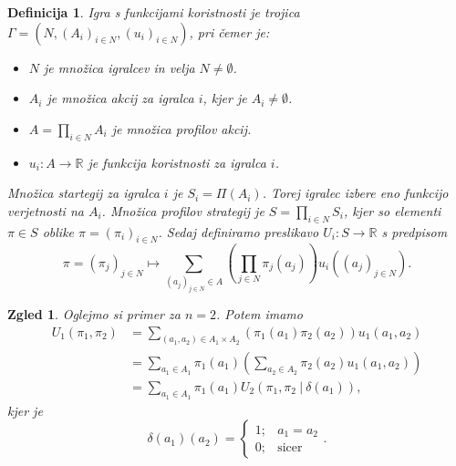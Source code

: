 \documentclass[10pt, a4paper]{article}
\newtheorem{defi}[izr]{Definicija}
\newenvironment{noticeB}{%
  \tcolorbox[%
  notitle,
  empty,
  enhanced,  %
  breakable,
  coltext=black,
  colback=white, 
  fontupper=\rmfamily,
  noparskip,
  sharp corners,
  boxrule=-1pt,  %
  frame hidden,
  left=7pt,  %
  right=7pt,
  top=5pt,
  bottom=5pt,
  before skip=2.5ex plus 2pt,
  after skip=2.5ex plus 2pt,
  borderline west = {1.5pt}{-0.1pt}{blue!30!black}, %
  overlay unbroken and last={%
    \draw[color=black, line width=1.25pt]
    ($(frame.south west)+(1.pt, -0.1pt)$) -- ++(2em, 0);
  }
  ]}
{\endtcolorbox}
\newenvironment{definicija}{\begin{noticeB}\begin{defi}}{%
    \end{defi}\end{noticeB}}
\newtheorem{zgled}[izr]{Zgled}
\newcommand{\R}{\mathbb {R}}
\begin{document}
\begin{definicija}
  Igra s funkcijami koristnosti je trojica $\Gamma = (N, (A_i)_{i \in N}, (u_i)_{i \in N})$,
  pri čemer je:
  \begin{itemize}
    \item $N$ je množica igralcev in velja $N \neq \emptyset$.
    \item $A_i$ je množica akcij za igralca $i$, kjer je $A_i \neq \emptyset$.
    \item $A = \prod_{i \in N} A_i$ je množica profilov akcij.
    \item $u_i: A \to \R$ je funkcija koristnosti za igralca $i$.
  \end{itemize}
  Množica startegij za igralca $i$ je $S_i = \Pi (A_i)$.
  Torej igralec izbere eno funkcijo verjetnosti na $A_i$.
  Množica profilov strategij je $S = \prod_{i \in N} S_i$, kjer so elementi $\pi \in S$ oblike $\pi = (\pi_i)_{i \in N}$.
  Sedaj definiramo preslikavo $U_i: S \to \R$ s predpisom 
  $$\pi = (\pi_j)_{j \in N} \mapsto \sum_{(a_j)_{j \in N} \in A} \left(\prod_{j \in N} \pi_j (a_j)\right) u_i ((a_j)_{j \in N}).$$
\end{definicija}

\begin{zgled}
  Oglejmo si primer za $n = 2$. Potem imamo 
  $$$$
  \begin{align*}
    U_1 (\pi_1, \pi_2) &= \sum_{(a_1, a_2) \in A_1 \times A_2} \left( \pi_1 (a_1) \pi_2 (a_2)\right) u_1 (a_1, a_2)\\
    &=\sum_{a_1 \in A_1} \pi_1 (a_1) \left(\sum_{a_2 \in A_2} \pi_2 (a_2) u_1 (a_1, a_2)\right)\\
    &= \sum_{a_1 \in A_1} \pi_1 (a_1) U_2 (\pi_1, \pi_2\ \big|\ \delta(a_1)), 
  \end{align*}
  kjer je $$\delta(a_1) (a_2) = \begin{cases}
    1; & a_1 = a_2\\
    0;& \textrm{sicer}
  \end{cases}.$$
\end{zgled}
\end{document}
